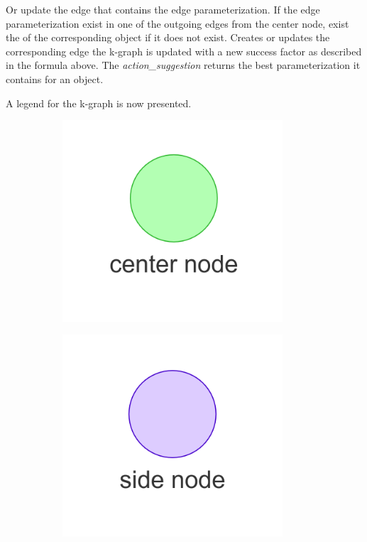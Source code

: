 Or update the edge that contains the edge parameterization. If the edge parameterization exist in one of the outgoing edges from the center node, exist the of the corresponding object if it does not exist. Creates or updates the corresponding edge  the \ac{k-graph} is updated with a new success factor as described in the formula above. The \textit{action\_suggestion} returns the best parameterization it contains for an object.\bs

A legend for the \ac{k-graph} is now presented.\bs

\begin{figure}[H]
    \centering
    \begin{subfigure}{0.3\textwidth}
    \centering
    \includegraphics[width=0.9\textwidth]{figures/proposed_method/center_node}
    \caption{}%
    \end{subfigure}
    \begin{subfigure}{0.3\textwidth}
    \centering
    \includegraphics[width=0.9\textwidth]{figures/proposed_method/side_node}

\end{subfigure}
\end{figure}
